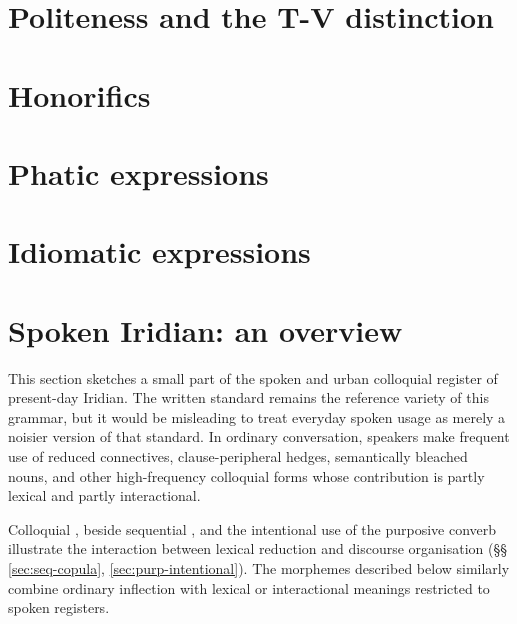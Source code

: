 \section{Politeness and the T-V distinction}\label{sec:politeness}


\section{Honorifics}\label{sec:honorifics}


\section{Phatic expressions}\label{sec:phatic}


\section{Idiomatic expressions}\label{sec:idioms}


%
%

\section{Spoken Iridian: an overview}\label{sec:spoken-overview}

This section sketches a small part of the spoken and urban colloquial register
of present-day Iridian. The written standard remains the reference variety of
this grammar, but it would be misleading to treat everyday spoken usage as
merely a noisier version of that standard. In ordinary conversation, speakers
make frequent use of reduced connectives, clause-peripheral hedges, semantically
bleached nouns, and other high-frequency colloquial forms whose contribution is
partly lexical and partly interactional.

Colloquial , beside sequential , and the intentional use
of the purposive converb illustrate the interaction between lexical reduction
and discourse organisation (§§\,\ref{sec:seq-copula},
\ref{sec:purp-intentional}). The morphemes described below similarly combine
ordinary inflection with lexical or interactional meanings restricted to spoken
registers.

